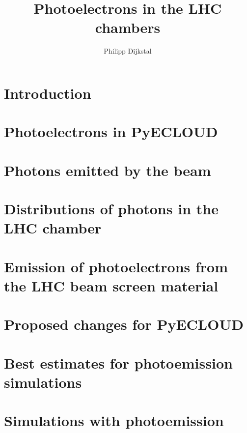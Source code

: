 \documentclass{scrartcl}
\title{Photoelectrons in the LHC chambers}
\author{Philipp Dijkstal}
\begin{document}
\maketitle
\tableofcontents
\clearpage

\section{Introduction}


\section{Photoelectrons in PyECLOUD}
    

\clearpage
\section{Photons emitted by the beam}
    

\clearpage
\section{Distributions of photons in the LHC chamber}
	

\clearpage
\section{Emission of photoelectrons from the LHC beam screen material}
	
    
    
    
    


\clearpage
\section{Proposed changes for PyECLOUD}
    

\clearpage
\section{Best estimates for photoemission simulations}
    \label{sec:best}
    

\clearpage
\section{Simulations with photoemission}
    \label{sec:simulation}
    

\clearpage
{}


\end{document}
